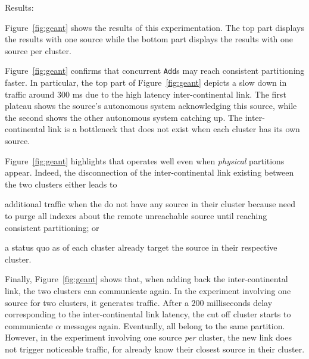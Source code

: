 \begin{asparadesc}
\item [Results:]

Figure~\ref{fig:geant} shows the results of this experimentation. The
top part displays the results with one source while the bottom part
displays the results with one source per cluster.

\noindent Figure~\ref{fig:geant} confirms that concurrent
\texttt{Add}s may reach consistent partitioning faster. In particular,
the top part of Figure~\ref{fig:geant} depicts a slow down in traffic
around $300$ ms due to the high latency inter-continental link. The
first plateau shows the source's autonomous system acknowledging this
source, while the second shows the other autonomous system catching
up.  The inter-continental link is a bottleneck that does not exist
when each cluster has its own source.

\noindent Figure~\ref{fig:geant} highlights that \NAME operates well
even when \emph{physical} partitions appear. Indeed, the disconnection
of the inter-continental link existing between the two clusters
either leads to 
\begin{inparaenum}[(i)]
\item additional traffic when the \processes do not have any source in
  their cluster because \processes need to purge all indexes about the
  remote unreachable source until reaching consistent partitioning; or
  \item a status quo as \processes of each 
  cluster already target the source in their respective cluster.
\end{inparaenum}

\noindent Finally, Figure~\ref{fig:geant} shows that, when adding back the
inter-continental link, the two clusters can communicate again. In the
experiment involving one source for two clusters, it generates
traffic. After a $200$ milliseconds delay corresponding to the inter-continental link
latency, the cut off cluster starts to communicate $\alpha$ messages
again. Eventually, all \processes belong to the same
partition. However, in the experiment involving one source \emph{per}
cluster, the new link does not trigger noticeable traffic, for
\processes already know their closest source in their cluster.

\end{asparadesc}

